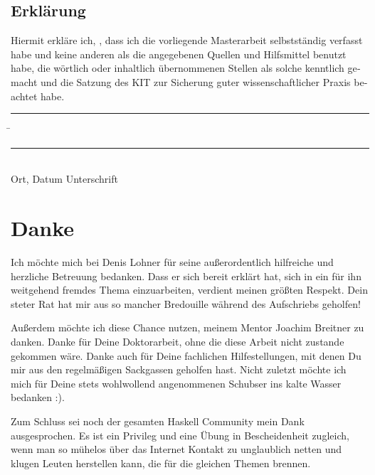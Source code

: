 \documentclass[12pt,a4paper,twoside,headings=openright]{scrreprt}
\begin{document}
\tableofcontents









\printbibliography

\begin{otherlanguage}{ngerman}
\chapter*{Erklärung}
\pagestyle{empty}

  \vspace{20mm}
  Hiermit erkläre ich, \theauthor, dass ich die vorliegende Masterarbeit selbst\-ständig
verfasst habe und keine anderen als die angegebenen Quellen und Hilfsmittel
benutzt habe, die wörtlich oder inhaltlich übernommenen Stellen als solche kenntlich gemacht und
die Satzung des KIT zur Sicherung guter wissenschaftlicher Praxis beachtet habe.
  \vspace{20mm}
  \begin{tabbing}
  \rule{4cm}{.4pt}\hspace{1cm} \= \rule{7cm}{.4pt} \\
 Ort, Datum \> Unterschrift
  \end{tabbing}
\end{otherlanguage}

\chapter*{Danke}
\pagestyle{empty}

Ich möchte mich bei Denis Lohner für seine außerordentlich hilfreiche und herzliche Betreuung bedanken.
Dass er sich bereit erklärt hat, sich in ein für ihn weitgehend fremdes Thema einzuarbeiten, verdient meinen größten Respekt.
Dein steter Rat hat mir aus so mancher Bredouille während des Aufschriebs geholfen!

Außerdem möchte ich diese Chance nutzen, meinem Mentor Joachim Breitner zu danken.
Danke für Deine Doktorarbeit, ohne die diese Arbeit nicht zustande gekommen wäre.
Danke auch für Deine fachlichen Hilfestellungen, mit denen Du mir aus den regelmäßigen Sackgassen geholfen hast.
Nicht zuletzt möchte ich mich für Deine stets wohlwollend angenommenen Schubser ins kalte Wasser bedanken :).

Zum Schluss sei noch der gesamten Haskell Community mein Dank ausgesprochen.
Es ist ein Privileg und eine Übung in Bescheidenheit zugleich, wenn man so mühelos über das Internet Kontakt zu unglaublich netten und klugen Leuten herstellen kann, die für die gleichen Themen brennen.

\pagestyle{fancy}
\appendix

%
\end{document}
